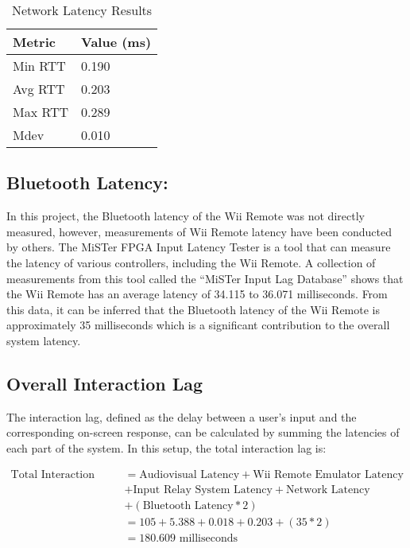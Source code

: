 \begin{table}[!ht]
    \centering
    \begin{tabular}{|l|l|}
    \hline
        Metric & Value (ms) \\ \hline
        Min RTT & 0.190 \\ \hline
        Avg RTT & 0.203 \\ \hline
        Max RTT & 0.289 \\ \hline
        Mdev & 0.010 \\ \hline
    \end{tabular}
    \caption{Network Latency Results}
    \label{table:network}
\end{table}


\subsection{Bluetooth Latency:}

In this project, the Bluetooth latency of the Wii Remote was not directly
measured, however, measurements of Wii Remote latency have
been conducted by others. The MiSTer FPGA Input Latency
Tester\cite{cathoderayblogTestYour} is a tool that can measure the latency of
various controllers, including the Wii Remote. A collection of measurements from
this tool called the ``MiSTer Input Lag Database''\cite{misterInputLagDatabase}
shows that the Wii Remote has an average latency of 34.115 to 36.071
milliseconds. From this data, it can be inferred that the Bluetooth latency of
the Wii Remote is approximately 35 milliseconds which is a significant
contribution to the overall system latency.

\subsection{Overall Interaction Lag}

The interaction lag, defined as the delay between a user’s input and the
corresponding on-screen response\cite{volkerseekerBestPaper}, can be calculated by
summing the latencies of each part of the system. In this setup, the total interaction lag is:

\begin{align*}
  \text{Total Interaction Lag} &= \text{Audiovisual Latency} + \text{Wii Remote Emulator Latency} \\
  &+ \text{Input Relay System Latency} + \text{Network Latency} \\
  &+ (\text{Bluetooth Latency} * 2) \\
  &= 105 + 5.388 + 0.018 + 0.203 + (35 * 2) \\
  &= 180.609 \text{ milliseconds}
\end{align*}

